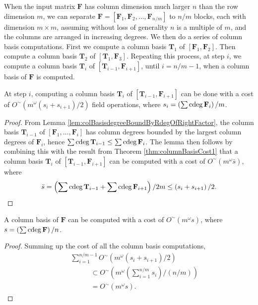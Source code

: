 When the input matrix $\mathbf{F}$ has column dimension much larger
$n$ than the row dimension $m$, we can separate $\mathbf{F}=\left[\mathbf{F}_{1},\mathbf{F}_{2},\dots,\mathbf{F}_{n/m}\right]$
to $n/m$ blocks, each with dimension $m\times m$, assuming without
loss of generality $n$ is a multiple of $m$, and the columns are
arranged in increasing degrees. We then do a series of column basis
computations. First we compute a column basis $\mathbf{T}_{1}$ of
$\left[\mathbf{F}_{1},\mathbf{F}_{2}\right]$. Then compute a column
basis $\mathbf{T}_{2}$ of $\left[\mathbf{T}_{1},\mathbf{F}_{3}\right]$.
Repeating this process, at step $i$, we compute a column basis $\mathbf{T}_{i}$
of $\left[\mathbf{T}_{i-1},\mathbf{F}_{i+1}\right]$, until $i=n/m-1$,
when a column basis of $\mathbf{F}$ is computed. 
\begin{lem}
At step $i$, computing a column basis $\mathbf{T}_{i}$ of $\left[\mathbf{T}_{i-1},\mathbf{F}_{i+1}\right]$
can be done with a cost of $O^{\sim}\left(m^{\omega}(s_{i}+s_{i+1})/2\right)$
field operations, where $s_{i}=\left(\sum\cdeg\mathbf{F}_{i}\right)/m$.\end{lem}
\begin{proof}
From Lemma \ref{lem:colBasisdegreeBoundByRdegOfRightFactor}, the
column basis $\mathbf{T}_{i-1}$ of $\left[\mathbf{F}_{1},\dots,\mathbf{F}_{i}\right]$
has column degrees bounded by the largest column degrees of $\mathbf{F}_{i}$,
hence $\sum\cdeg\mathbf{T}_{i-1}\le\sum\cdeg\mathbf{F}_{i}$. The
lemma then follows by combining this with the result from Theorem
\ref{thm:columnBasisCost1} that a column basis $\mathbf{T}_{i}$
of $\left[\mathbf{T}_{i-1},\mathbf{F}_{i+1}\right]$ can be computed
with a cost of $O^{\sim}\left(m^{\omega}\bar{s}\right)$, where 
\[
\bar{s}=\left(\sum\cdeg\mathbf{T}_{i-1}+\sum\cdeg\mathbf{F}_{i+1}\right)/2m\le\left(s_{i}+s_{i+1}\right)/2.
\]
 \end{proof}
\begin{thm}
\label{thm:finalCollBasisCost}A column basis of $\mathbf{F}$ can
be computed with a cost of $O^{\sim}\left(m^{\omega}s\right)$, where
$s=\left(\sum\cdeg\mathbf{F}\right)/n$.\end{thm}
\begin{proof}
Summing up the cost of all the column basis computations, 
\begin{eqnarray*}
 &  & \sum_{i=1}^{n/m-1}O^{\sim}\left(m^{\omega}\left(s_{i}+s_{i+1}\right)/2\right)\\
 &  & ~~~~~~~~~~~~~\subset O^{\sim}\left(m^{\omega}\left(\sum_{i=1}^{n/m}s_{i}\right)/(n/m)\right)\\
 &  & ~~~~~~~~~~~~~=O^{\sim}\left(m^{\omega}s\right).
\end{eqnarray*}
\end{proof}
